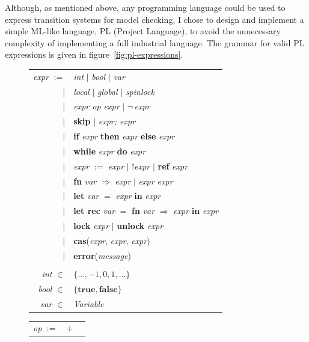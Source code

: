 \documentclass[12pt,a4paper,twoside,openright]{report}
\begin{document}
Although, as mentioned above, any programming language
could be used to express transition systems for model
checking, I chose to design and implement a simple
ML-like language, PL (Project Language), to avoid
the unnecessary complexity of implementing a full
industrial language.
The grammar for valid PL expressions is given in
figure~\ref{fig:pl-expressions}.

\begin{figure}
	\centering
	\setlength{\tabcolsep}{2pt}
	\begin{tabular}{rl}
		\textit{expr} $:=$ & \textit{int} $\vert$ \textit{bool} $\vert$ \textit{var} \\
		$\vert$ & \textit{local} $\vert$ \textit{global}
			$\vert$ \textit{spinlock} \\ 
		$\vert$ & \textit{expr op expr} $\vert$ $\neg\,$\textit{expr} \\
		$\vert$ & \textbf{skip} $\vert$ \textit{expr; expr}\\
		$\vert$ & \textbf{if} \textit{expr}
			\textbf{then} \textit{expr} \textbf{else} \textit{expr} \\
		$\vert$ & \textbf{while} \textit{expr}
			\textbf{do} \textit{expr} \\
		$\vert$ & \textit{expr} $:=$ \textit{expr} $\vert$ !\textit{expr} 
			$\vert$ \textbf{ref} \textit{expr} \\
		$\vert$ & \textbf{fn} \textit{var}
			$\Rightarrow$ \textit{expr} $\vert$ \textit{expr expr} \\
		$\vert$ & \textbf{let} \textit{var} $=$
			\textit{expr} \textbf{in} \textit{expr} \\
		$\vert$ & \textbf{let rec} \textit{var} $=$
			\textbf{fn} \textit{var} $\Rightarrow$
			\textit{expr} \textbf{in} \textit{expr} \\
		$\vert$ & \textbf{lock} \textit{expr} $\vert$
			\textbf{unlock} \textit{expr} \\
		$\vert$ & \textbf{cas}(\textit{expr}, \textit{expr}, \textit{expr}) \\
		$\vert$ & \textbf{error}(\textit{message}) \\
		& \\
		\textit{int} $\in$ & $\{\ldots, -1, 0, 1, \ldots\}$ \\
		\textit{bool} $\in$ & $\{\textbf{true}, \textbf{false}\}$ \\
		\textit{var} $\in$ & \textit{Variable}
	\end{tabular}
	\qquad\quad
	\begin{tabular}{rcl}
		\textit{op} $:=$ & $+$ &\\

\end{tabular}
\end{figure}
\end{document}
